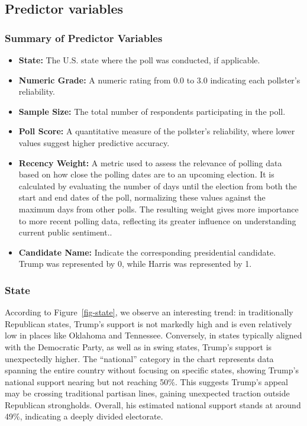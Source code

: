 \documentclass[
  letterpaper,
  DIV=11,
  numbers=noendperiod]{scrartcl}
\begin{document}
\hypertarget{predictor-variables}{%
\subsection{Predictor variables}\label{predictor-variables}}

\hypertarget{summary-of-predictor-variables}{%
\subsubsection{Summary of Predictor
Variables}\label{summary-of-predictor-variables}}

\begin{itemize}
\item
  \textbf{State:} The U.S. state where the poll was conducted, if
  applicable.
\item
  \textbf{Numeric Grade:} A numeric rating from 0.0 to 3.0 indicating
  each pollster's reliability.
\item
  \textbf{Sample Size:} The total number of respondents participating in
  the poll.
\item
  \textbf{Poll Score:} A quantitative measure of the pollster's
  reliability, where lower values suggest higher predictive accuracy.
\item
  \textbf{Recency Weight:} A metric used to assess the relevance of
  polling data based on how close the polling dates are to an upcoming
  election. It is calculated by evaluating the number of days until the
  election from both the start and end dates of the poll, normalizing
  these values against the maximum days from other polls. The resulting
  weight gives more importance to more recent polling data, reflecting
  its greater influence on understanding current public sentiment..
\item
  \textbf{Candidate Name:} Indicate the corresponding presidential
  candidate. Trump was represented by 0, while Harris was represented by
  1.
\end{itemize}

\hypertarget{state}{%
\subsubsection{State}\label{state}}

According to Figure~\ref{fig-state}, we observe an interesting trend: in
traditionally Republican states, Trump's support is not markedly high
and is even relatively low in places like Oklahoma and Tennessee.
Conversely, in states typically aligned with the Democratic Party, as
well as in swing states, Trump's support is unexpectedly higher. The
``national'' category in the chart represents data spanning the entire
country without focusing on specific states, showing Trump's national
support nearing but not reaching 50\%. This suggests Trump's appeal may
be crossing traditional partisan lines, gaining unexpected traction
outside Republican strongholds. Overall, his estimated national support
stands at around 49\%, indicating a deeply divided electorate.
\end{document}
